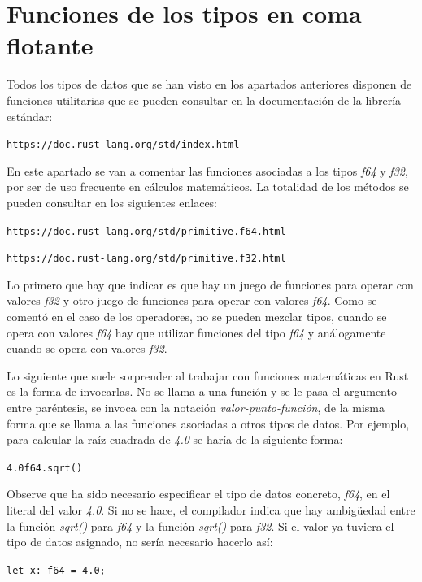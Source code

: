 \section{Funciones de los tipos en coma flotante}
\noindent Todos los tipos de datos que se han visto en los apartados anteriores disponen de funciones utilitarias que se pueden consultar en la documentación de la librería estándar:

{\centering \texttt{https://doc.rust-lang.org/std/index.html} \par}

En este apartado se van a comentar las funciones asociadas a los tipos \textit{f64} y \textit{f32}, por ser de uso frecuente en cálculos matemáticos. La totalidad de los métodos se pueden consultar en los siguientes enlaces:

{\centering \texttt{https://doc.rust-lang.org/std/primitive.f64.html} \par}

{\centering \texttt{https://doc.rust-lang.org/std/primitive.f32.html} \par}

Lo primero que hay que indicar es que hay un juego de funciones para operar con valores \textit{f32} y otro juego de funciones para operar con valores \textit{f64}. Como se comentó en el caso de los operadores, no se pueden mezclar tipos, cuando se opera con valores \textit{f64} hay que utilizar funciones del tipo \textit{f64} y análogamente cuando se opera con valores \textit{f32}.

Lo siguiente que suele sorprender al trabajar con funciones matemáticas en Rust es la forma de invocarlas. No se llama a una función y se le pasa el argumento entre paréntesis, se invoca con la notación \textit{valor-punto-función}, de la misma forma que se llama a las funciones asociadas a otros tipos de datos. Por ejemplo, para calcular la raíz cuadrada de \textit{4.0} se haría de la siguiente forma:

{\centering \texttt{4.0f64.sqrt()} \par}

Observe que ha sido necesario especificar el tipo de datos concreto, \textit{f64}, en el literal del valor \textit{4.0}. Si no se hace, el compilador indica que hay ambigüedad entre la función \textit{sqrt()} para \textit{f64} y la función \textit{sqrt()} para \textit{f32}. Si el valor ya tuviera el tipo de datos asignado, no sería necesario hacerlo así:

{\hspace{7em} \texttt{let x: f64 = 4.0;} \par}


